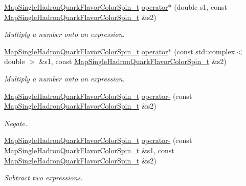\begin{DoxyCompactItemize}
\item 
\mbox{\hyperlink{namespaceHadron_a03b319764f85c20434f20a269ce5f388}{Map\+Single\+Hadron\+Quark\+Flavor\+Color\+Spin\+\_\+t}} \mbox{\hyperlink{namespaceHadron_af8f26e76a642072270a910f3326d758f}{operator$\ast$}} (double s1, const \mbox{\hyperlink{namespaceHadron_a03b319764f85c20434f20a269ce5f388}{Map\+Single\+Hadron\+Quark\+Flavor\+Color\+Spin\+\_\+t}} \&s2)
\begin{DoxyCompactList}\small\item\em Multiply a number onto an expression. \end{DoxyCompactList}\item 
\mbox{\hyperlink{namespaceHadron_a03b319764f85c20434f20a269ce5f388}{Map\+Single\+Hadron\+Quark\+Flavor\+Color\+Spin\+\_\+t}} \mbox{\hyperlink{namespaceHadron_afeecee88605be038ceda273e796e53fd}{operator$\ast$}} (const std\+::complex$<$ double $>$ \&s1, const \mbox{\hyperlink{namespaceHadron_a03b319764f85c20434f20a269ce5f388}{Map\+Single\+Hadron\+Quark\+Flavor\+Color\+Spin\+\_\+t}} \&s2)
\begin{DoxyCompactList}\small\item\em Multiply a number onto an expression. \end{DoxyCompactList}\item 
\mbox{\hyperlink{namespaceHadron_a03b319764f85c20434f20a269ce5f388}{Map\+Single\+Hadron\+Quark\+Flavor\+Color\+Spin\+\_\+t}} \mbox{\hyperlink{namespaceHadron_a2cee38a50a5e1ed5fbff1d9e4df08bdd}{operator-\/}} (const \mbox{\hyperlink{namespaceHadron_a03b319764f85c20434f20a269ce5f388}{Map\+Single\+Hadron\+Quark\+Flavor\+Color\+Spin\+\_\+t}} \&s2)
\begin{DoxyCompactList}\small\item\em Negate. \end{DoxyCompactList}\item 
\mbox{\hyperlink{namespaceHadron_a03b319764f85c20434f20a269ce5f388}{Map\+Single\+Hadron\+Quark\+Flavor\+Color\+Spin\+\_\+t}} \mbox{\hyperlink{namespaceHadron_ad7c424c3185becdcc1423060951ff98e}{operator-\/}} (const \mbox{\hyperlink{namespaceHadron_a03b319764f85c20434f20a269ce5f388}{Map\+Single\+Hadron\+Quark\+Flavor\+Color\+Spin\+\_\+t}} \&s1, const \mbox{\hyperlink{namespaceHadron_a03b319764f85c20434f20a269ce5f388}{Map\+Single\+Hadron\+Quark\+Flavor\+Color\+Spin\+\_\+t}} \&s2)
\begin{DoxyCompactList}\small\item\em Subtract two expressions. \end{DoxyCompactList}\item 

\end{DoxyCompactItemize}
